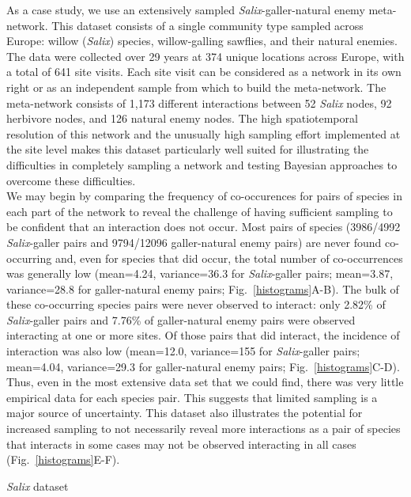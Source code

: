 \documentclass[12pt]{article}
\begin{document}
\begin{floatbox}{}

    \indent As a case study, we use an extensively sampled \emph{Salix}-galler-natural enemy meta-network. This dataset consists of a single community type sampled across Europe: willow (\emph{Salix}) species, willow-galling sawflies, and their natural enemies. The data were collected over 29 years at 374 unique locations across Europe, with a total of 641 site visits. Each site visit can be considered as a network in its own right or as an independent sample from which to build the meta-network. The meta-network consists of 1,173 different interactions between 52 \emph{Salix} nodes, 92 herbivore nodes, and 126 natural enemy nodes. The high spatiotemporal resolution of this network and the unusually high sampling effort implemented at the site level makes this dataset particularly well suited for illustrating the difficulties in completely sampling a network and testing Bayesian approaches to overcome these difficulties.\\
    \indent We may begin by comparing the frequency of co-occurences for pairs of species in each part of the network to reveal the challenge of having sufficient sampling to be confident that an interaction does not occur. Most pairs of species (3986/4992 \emph{Salix}-galler pairs and  9794/12096 galler-natural enemy pairs) are never found co-occurring and, even for species that did occur, the total number of co-occurrences was generally low (mean=4.24, variance=36.3 for \emph{Salix}-galler pairs; mean=3.87, variance=28.8 for galler-natural enemy pairs; Fig.~\ref{histograms}A-B). The bulk of these co-occurring species pairs were never observed to interact: only 2.82\% of \emph{Salix}-galler pairs and 7.76\% of galler-natural enemy pairs were observed interacting at one or more sites. Of those pairs that did interact, the incidence of interaction was also low (mean=12.0, variance=155 for \emph{Salix}-galler pairs; mean=4.04, variance=29.3 for galler-natural enemy pairs; Fig.~\ref{histograms}C-D). Thus, even in the most extensive data set that we could find, there was very little empirical data for each species pair. This suggests that limited sampling is a major source of uncertainty. This dataset also illustrates the potential for increased sampling to not necessarily reveal more interactions as a pair of species that interacts in some cases may not be observed interacting in all cases (Fig.~\ref{histograms}E-F).
  \caption{\emph{Salix} dataset}
  \label{box1}
\end{floatbox}
\end{document}
